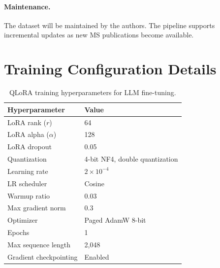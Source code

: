 \documentclass[11pt]{article}
\begin{document}
\paragraph{Maintenance.}
The dataset will be maintained by the authors. The pipeline supports
incremental updates as new MS publications become available.


\section{Training Configuration Details}
\label{app:config}

\begin{table}[h]
\centering
\caption{QLoRA training hyperparameters for LLM fine-tuning.}
\label{tab:hyperparams}
\small
\begin{tabular}{@{}ll@{}}
\toprule
\textbf{Hyperparameter} & \textbf{Value} \\
\midrule
LoRA rank ($r$)          & 64 \\
LoRA alpha ($\alpha$)    & 128 \\
LoRA dropout             & 0.05 \\
Quantization             & 4-bit NF4, double quantization \\
Learning rate            & $2 \times 10^{-4}$ \\
LR scheduler             & Cosine \\
Warmup ratio             & 0.03 \\
Max gradient norm        & 0.3 \\
Optimizer                & Paged AdamW 8-bit \\
Epochs                   & 1 \\
Max sequence length      & 2,048 \\
Gradient checkpointing   & Enabled \\
\bottomrule
\end{tabular}
\end{table}
\end{document}
